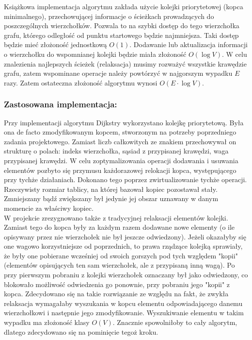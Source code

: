 \documentclass[a4paper,12pt]{article}
\begin{document}
\noindent
Książkowa implementacja algorytmu zakłada użycie kolejki priorytetowej (kopca minimalnego), przechowującej informacje o ścieżkach prowadzących do poszczególnych wierzchołków. Pozwala to na szybki dostęp do tego wierzchołka grafu, którego odległość od punktu startowego będzie najmniejsza. Taki dostęp będzie mieć złożoność jednostkową $O(1)$. Dodawanie lub aktualizacja informacji o wierzchołku do wspomnianej kolejki będzie miała złożoność $O(\log V)$. W celu znalezienia najlepszych ścieżek (relaksacja) musimy rozważyć wszystkie krawędzie grafu, zatem wspominane operacje należy powtórzyć w najgorszym wypadku $E$ razy. Zatem ostateczna złożoność algorytmu wynosi $O (E \cdot \log V)$.

\subsubsection{Zastosowana implementacja:}
Przy implementacji algorytmu Dijkstry wykorzystano kolejkę priorytetową. Była ona de facto zmodyfikowanym kopcem, stworzonym na potrzeby poprzedniego zadania projektowego. Zamiast liczb całkowitych ze znakiem przechowywał on strukturę o polach: indeks wierzchołka, sąsiad z przypisanej krawędzi, waga przypisanej krawędzi. W celu zoptymalizowania operacji dodawania i usuwania elementów pozbyto się przymusu każdorazowej relokacji kopca, występującego przy tychże działaniach. Dokonano tego poprzez zwirtualizowanie tychże operacji. Rzeczywisty rozmiar tablicy, na której bazował kopiec pozostawał stały. Zmniejszany bądź zwiększany był jedynie jej obszar uznawany w danym momencie za właściwy kopiec.\\

\noindent
W projekcie zrezygnowano także z tradycyjnej relaksacji elementów kolejki. Zamiast tego do kopca były za każdym razem dodawane nowe elementy (o ile opisywany przez nie wierzchołek nie był jeszcze odwiedzony). Jeżeli okazałyby się one wagowo korzystniejsze od poprzednich, to prawa rządzące kolejką sprawiały, że były one pobierane wcześniej od swoich gorszych pod tych względem "kopii" (elementów opisujących ten sam wierzchołek, ale z przypisaną inną wagą). Po przy pierwszym pobraniu z kolejki wierzchołek oznaczany był jako odwiedzony, co blokowało możliwość odwiedzenia go ponownie, przy pobraniu jego "kopii" z kopca. Zdecydowano się na takie rozwiązanie ze względu na fakt, że zwykła relaksacja wymagałaby wyszukania w kopcu elementu odpowiadającego danemu wierzchołkowi i następnie jego zmodyfikowanie. Wyszukiwanie elementu w takim wypadku ma złożoność klasy $O(V)$. Znacznie spowolniłoby to cały algorytm, dlatego zdecydowano się na pominięcie tegoż kroku.
\end{document}

